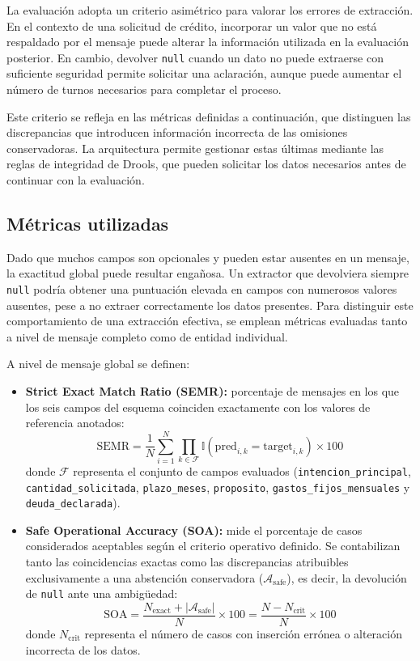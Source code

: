 \documentclass[12pt,a4paper]{report}
\begin{document}
La evaluación adopta un criterio asimétrico para valorar los errores de extracción. En el contexto de una solicitud de crédito, incorporar un valor que no está respaldado por el mensaje puede alterar la información utilizada en la evaluación posterior. En cambio, devolver \texttt{null} cuando un dato no puede extraerse con suficiente seguridad permite solicitar una aclaración, aunque puede aumentar el número de turnos necesarios para completar el proceso.

Este criterio se refleja en las métricas definidas a continuación, que distinguen las discrepancias que introducen información incorrecta de las omisiones conservadoras. La arquitectura permite gestionar estas últimas mediante las reglas de integridad de Drools, que pueden solicitar los datos necesarios antes de continuar con la evaluación.

\subsection{Métricas utilizadas}

Dado que muchos campos son opcionales y pueden estar ausentes en un mensaje, la exactitud global puede resultar engañosa. Un extractor que devolviera siempre \texttt{null} podría obtener una puntuación elevada en campos con numerosos valores ausentes, pese a no extraer correctamente los datos presentes. Para distinguir este comportamiento de una extracción efectiva, se emplean métricas evaluadas tanto a nivel de mensaje completo como de entidad individual.

A nivel de mensaje global se definen:

\begin{itemize}
    \item \textbf{Strict Exact Match Ratio (SEMR):} porcentaje de mensajes en los que los seis campos del esquema coinciden exactamente con los valores de referencia anotados:
    $$\text{SEMR} = \frac{1}{N} \sum_{i=1}^{N} \prod_{k \in \mathcal{F}} \mathbb{I}(\text{pred}_{i,k} = \text{target}_{i,k}) \times 100$$
    donde $\mathcal{F}$ representa el conjunto de campos evaluados (\texttt{intencion\_principal}, \texttt{cantidad\_solicitada}, \texttt{plazo\_meses}, \texttt{proposito}, \texttt{gastos\_fijos\_mensuales} y \texttt{deuda\_declarada}).

    \item \textbf{Safe Operational Accuracy (SOA):} mide el porcentaje de casos considerados aceptables según el criterio operativo definido. Se contabilizan tanto las coincidencias exactas como las discrepancias atribuibles exclusivamente a una abstención conservadora ($\mathcal{A}_{\text{safe}}$), es decir, la devolución de \texttt{null} ante una ambigüedad:
    $$\text{SOA} = \frac{N_{\text{exact}} + |\mathcal{A}_{\text{safe}}|}{N} \times 100 = \frac{N - N_{\text{crit}}}{N} \times 100$$
    donde $N_{\text{crit}}$ representa el número de casos con inserción errónea o alteración incorrecta de los datos.
\end{itemize}
\end{document}
